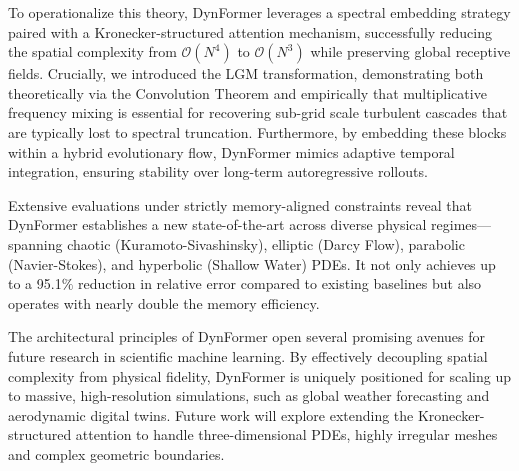 \documentclass[final,3p,times]{elsarticle}
\begin{document}
To operationalize this theory, DynFormer leverages a spectral embedding strategy paired with a Kronecker-structured attention mechanism, successfully reducing the spatial complexity from $\mathcal{O}(N^4)$ to $\mathcal{O}(N^3)$ while preserving global receptive fields. Crucially, we introduced the LGM transformation, demonstrating both theoretically via the Convolution Theorem and empirically that multiplicative frequency mixing is essential for recovering sub-grid scale turbulent cascades that are typically lost to spectral truncation. Furthermore, by embedding these blocks within a hybrid evolutionary flow, DynFormer mimics adaptive temporal integration, ensuring stability over long-term autoregressive rollouts.

Extensive evaluations under strictly memory-aligned constraints reveal that DynFormer establishes a new state-of-the-art across diverse physical regimes—spanning chaotic (Kuramoto-Sivashinsky), elliptic (Darcy Flow), parabolic (Navier-Stokes), and hyperbolic (Shallow Water) PDEs. It not only achieves up to a 95.1$\%$ reduction in relative error compared to existing baselines but also operates with nearly double the memory efficiency. 

The architectural principles of DynFormer open several promising avenues for future research in scientific machine learning. By effectively decoupling spatial complexity from physical fidelity, DynFormer is uniquely positioned for scaling up to massive, high-resolution simulations, such as global weather forecasting and aerodynamic digital twins. Future work will explore extending the Kronecker-structured attention to handle three-dimensional PDEs, highly irregular meshes and complex geometric boundaries.
\end{document}
